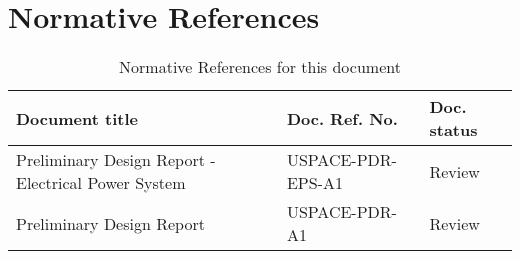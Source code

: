 \thispagestyle{plain}
\section*{Normative References}
%
%
\begin{table}[H]
\centering
\caption{Normative References for this document}
\label{tab:normative_references}
\begin{minipage}{\textwidth}
\begin{tabular}{p{}p{}p{}}
\hline
\textbf{Document title} & \textbf{Doc. Ref. No.} & \textbf{Doc. status}\\
\hline
Preliminary Design Report - Electrical Power System & USPACE-PDR-EPS-A1 & Review\\
Preliminary Design Report & USPACE-PDR-A1 & Review\\
\hline
\end{tabular}\par
\vspace{-0.75\skip\footins}
\renewcommand{\footnoterule}{}
\end{minipage}
\end{table}